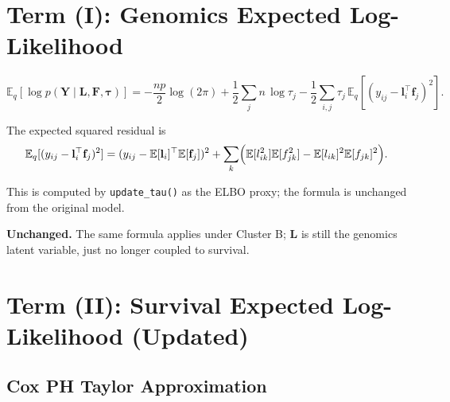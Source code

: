 \documentclass[11pt]{article}
\newcommand{\E}{\mathbb{E}}
\begin{document}
\section{Term (I): Genomics Expected Log-Likelihood}

\begin{equation}
  \E_q[\log p(\mathbf{Y} \mid \mathbf{L}, \mathbf{F}, \boldsymbol\tau)]
  = -\frac{n p}{2}\log(2\pi)
    + \frac{1}{2}\sum_j n\,\log\tau_j
    - \frac{1}{2}\sum_{i,j}\tau_j\,\E_q[(y_{ij} - \mathbf{l}_i^\top\mathbf{f}_j)^2].
  \label{eq:genomics-elbo}
\end{equation}

The expected squared residual is
\[
  \E_q[(y_{ij} - \mathbf{l}_i^\top\mathbf{f}_j)^2]
  = (y_{ij} - \E[\mathbf{l}_i]^\top\E[\mathbf{f}_j])^2
    + \sum_k \Bigl(\E[l_{ik}^2]\E[f_{jk}^2] - \E[l_{ik}]^2\E[f_{jk}]^2\Bigr).
\]

This is computed by \texttt{update\_tau()} as the ELBO proxy; the formula is unchanged from
the original model.

\begin{verifybox}
\textbf{Unchanged.} The same formula applies under Cluster B; $\mathbf{L}$ is still
the genomics latent variable, just no longer coupled to survival.
\end{verifybox}

\section{Term (II): Survival Expected Log-Likelihood (Updated)}

\subsection{Cox PH Taylor Approximation}
\end{document}
